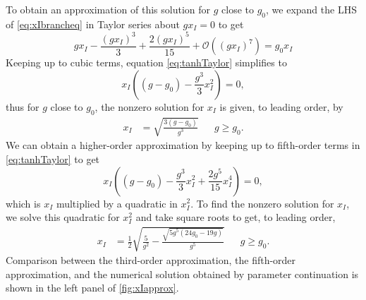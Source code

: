 \documentclass[11pt,reqno]{amsart}
\begin{document}
To obtain an approximation of this solution for $g$ close to $g_0$, we expand the LHS of \cref{eq:xIbrancheq} in Taylor series about $g x_I = 0$ to get
\begin{equation}\label{eq:tanhTaylor}
g x_I - \frac{(g x_I)^3}{3} + \frac{2(g x_I)^5}{15} + \mathcal{O}\left( (g x_I)^7 \right) = g_0 x_I
\end{equation}
Keeping up to cubic terms, equation \cref{eq:tanhTaylor} simplifies to
\[
x_I \left( (g - g_0) - \frac{g^3}{3} x_I^2 \right) = 0,
\]
thus for $g$ close to $g_0$, the nonzero solution for $x_I$ is given, to leading order, by
\begin{align}\label{eq:xIapprox}
x_I &= \sqrt{ \frac{3(g - g_0) }{g^3}} && g \geq g_0.
\end{align}
We can obtain a higher-order approximation by keeping up to fifth-order terms in \cref{eq:tanhTaylor} to get
\begin{equation*}
x_I \left( (g - g_0) - \frac{g^3}{3} x_I^2 + \frac{2 g^5}{15} x_I^4 \right) = 0,
\end{equation*}
which is $x_I$ multiplied by a quadratic in $x_I^2$. To find the nonzero solution for $x_I$, we solve this quadratic for $x_I^2$ and take square roots to get, to leading order,
\begin{align}\label{eq:xIapprox5}
x_I &= \frac{1}{2} \sqrt{ \frac{5}{g^2} - \frac{\sqrt{ 5 g^5( 24 g_0 - 19 g) }}{g^5}} && g \geq g_0.
\end{align}
Comparison between the third-order approximation, the fifth-order approximation, and the numerical solution obtained by parameter continuation is shown in the left panel of \cref{fig:xIapprox}.
\end{document}
